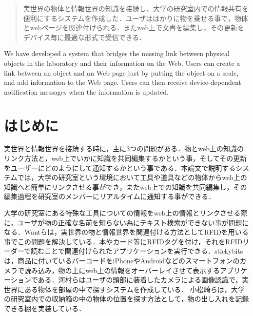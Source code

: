 
\begin{abstract}
実世界の物体と情報世界の知識を接続し，大学の研究室内での情報共有を便利にするシステムを作成した．ユーザははかりに物を乗せる事で，物体とwebページを関連付けられる．またweb上で文書を編集し，その更新をデバイス毎に最適な形式で受信できる．
\end{abstract}

\begin{eabstract}
We have developed a system that bridges the missing link between physical objects in the laboratory and their information on the Web. Users can create a link between an object and an Web page just by putting the object on a scale, and add information to the Web page. Users can then receive device-dependent notification messages when the information is updated.
\end{eabstract}

\maketitle

\section{はじめに}\label{sec:Introduction}
実世界と情報世界を接続する時に，主に3つの問題がある．物とweb上の知識のリンク方法と，web上でいかに知識を共同編集するかという事，そしてその更新をユーザーにどのようにして通知するかという事である．本論文で説明するシステムでは，大学の研究室という環境において工具や道具などの物体からweb上の知識へと簡単にリンクさせる事ができ，またweb上での知識を共同編集し，その編集過程を研究室のメンバーにリアルタイムに通知する事ができる．

大学の研究室にある特殊な工具についての情報をweb上の情報とリンクさせる際に，ユーザが物の正確な名前を知らない為にテキスト検索ができない事が問題になる．Wantらは，実世界の物と情報世界を関連付ける方法としてRFIDを用いる事でこの問題を解決している．\cite{rfid}本やカード等にRFIDタグを付け，それをRFIDリーダーで読むことで関連付けられたアプリケーションを実行できる．stickybits\cite{stickybits}は，商品に付いているバーコードをiPhoneやAndroidなどのスマートフォンのカメラで読み込み，物の上にweb上の情報をオーバーレイさせて表示するアプリケーションである．河村らはユーザの頭部に装着したカメラによる画像認識で，実世界にある物体を部屋の中で探すシステムを作成している．\cite{head_cam} 小松崎らは，大学の研究室内での収納箱の中の物体の位置を探す方法として，物の出し入れを記録できる棚を実装している．\cite{drawer}

